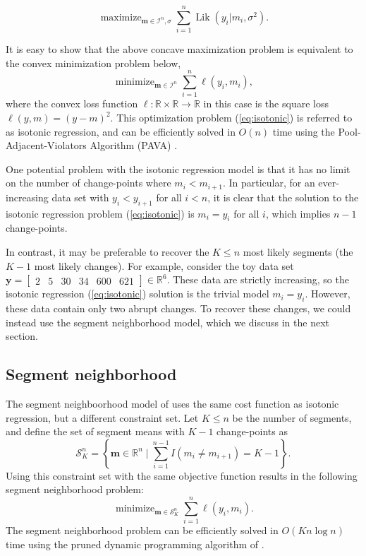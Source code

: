 \documentclass{article}
\DeclareMathOperator*{\Lik}{Lik}
\DeclareMathOperator*{\maximize}{maximize}
\DeclareMathOperator*{\minimize}{minimize}
\newcommand{\RR}{\mathbb R}
\begin{document}
\begin{equation}
  \label{eq:max_lik}
  \maximize_{\mathbf m\in\mathcal I^n, \sigma} \sum_{i=1}^n \Lik(y_i| m_i, \sigma^2).
\end{equation}

It is easy to show that the above concave maximization problem is equivalent
to the convex minimization problem below,
\begin{equation}
  \label{eq:isotonic}
  \minimize_{\mathbf m\in\mathcal I^n} \sum_{i=1}^n \ell(y_i, m_i),
\end{equation}
where the convex loss function $\ell:\RR\times \RR\rightarrow\RR$ in
this case is the square loss $\ell(y, m) = (y-m)^2$. This optimization
problem (\ref{eq:isotonic}) is referred to as isotonic regression, and
can be efficiently solved in $O(n)$ time using the
Pool-Adjacent-Violators Algorithm (PAVA) \citep{isotonic-unifying}.

One potential problem with the isotonic regression model is that it
has no limit on the number of change-points where $m_i < m_{i+1}$. In
particular, for an ever-increasing data set with $y_i < y_{i+1}$ for
all $i<n$, it is clear that the solution to the isotonic regression
problem (\ref{eq:isotonic}) is $m_i=y_i$ for all $i$, which implies
$n-1$ change-points. 

In contrast, it may be preferable to recover the $K\leq n$ most likely
segments (the $K-1$ most likely changes). For example, consider the
toy data set $\mathbf y= \left[
\begin{array}{cccccc}
  2 & 5 & 30 & 34 & 600 & 621
\end{array}
\right] \in\RR^6$. These data are strictly increasing, so the isotonic
regression (\ref{eq:isotonic}) solution is the trivial model
$m_i=y_i$. However, these data contain only two abrupt changes. To
recover these changes, we could instead use the segment
neighborhood model, which we discuss in the next section.

\subsection{Segment neighborhood}

The segment neighboorhood model of \citet{segment-neighborhood} uses
the same cost function as isotonic regression, but a different
constraint set. Let $K\leq n$ be the number of segments, and define
the set of segment means with $K-1$ change-points as
\begin{equation}
  \label{eq:Sk}
  \mathcal S_K^n = \left\{
  \mathbf m\in\RR^n
  \mid
  \sum_{i=1}^{n-1} I(m_i \neq m_{i+1}) = K-1
  \right\}.
\end{equation}
Using this constraint set with the same objective function results in
the following segment neighborhood problem:
\begin{equation}
  \label{eq:optimal_segment_neighborhood}
  \minimize_{\mathbf m\in\mathcal S_K^n} \sum_{i=1}^n \ell(y_i, m_i).
\end{equation}
The segment neighborhood problem can be efficiently solved in
$O(K n \log n)$ time using the pruned dynamic programming algorithm of
\citet{pruned-dp}.
\end{document}
